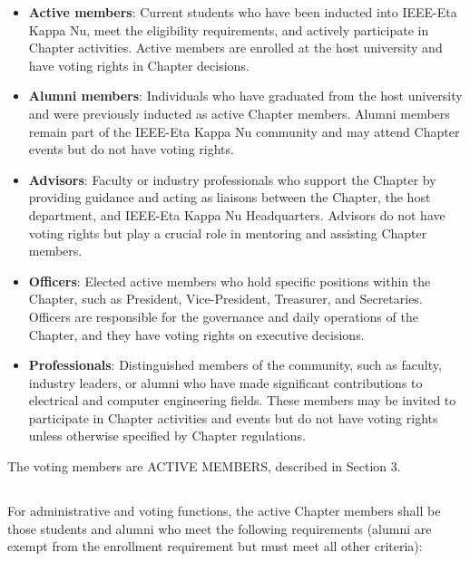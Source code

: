 \documentclass[10pt, oneside]{article}
\begin{document}
\begin{itemize}
    \item \textbf{Active members}: Current students who have been inducted into IEEE-Eta Kappa Nu, meet the eligibility requirements, and actively participate in Chapter activities. Active members are enrolled at the host university and have voting rights in Chapter decisions.

    \item \textbf{Alumni members}: Individuals who have graduated from the host university and were previously inducted as active Chapter members. Alumni members remain part of the IEEE-Eta Kappa Nu community and may attend Chapter events but do not have voting rights.

    \item \textbf{Advisors}: Faculty or industry professionals who support the Chapter by providing guidance and acting as liaisons between the Chapter, the host department, and IEEE-Eta Kappa Nu Headquarters. Advisors do not have voting rights but play a crucial role in mentoring and assisting Chapter members.

    \item \textbf{Officers}: Elected active members who hold specific positions within the Chapter, such as President, Vice-President, Treasurer, and Secretaries. Officers are responsible for the governance and daily operations of the Chapter, and they have voting rights on executive decisions.

    \item \textbf{Professionals}: Distinguished members of the community, such as faculty, industry leaders, or alumni who have made significant contributions to electrical and computer engineering fields. These members may be invited to participate in Chapter activities and events but do not have voting rights unless otherwise specified by Chapter regulations.
\end{itemize}
The voting members are ACTIVE MEMBERS, described in Section 3.


\subsection{}
For administrative and voting functions, the active Chapter members shall be those students and alumni who meet the following requirements (alumni are exempt from the enrollment requirement but must meet all other criteria):
\end{document}

